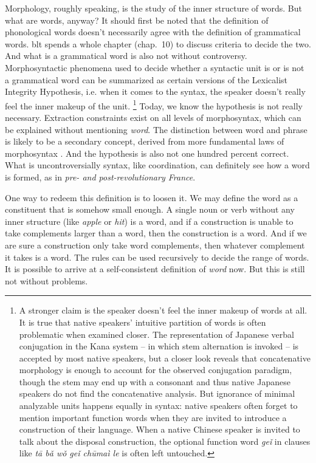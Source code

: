 \documentclass[UTF8, a4paper, oneside, scheme=plain]{ctexart}
\newcommand*{\citechap}[1]{chap.~{#1}}
\newcommand*{\term}[1]{\emph{#1}}
\newcommand*{\corpus}[1]{\emph{#1}}
\begin{document}
Morphology, roughly speaking, 
is the study of the inner structure of words.
But what are words, anyway?
It should first be noted that the definition of phonological words 
doesn't necessarily agree with the definition of grammatical words.
\ac{blt} spends a whole chapter (\citechap{10}) to discuss 
criteria to decide the two.
And what is a grammatical word is also not without controversy.
Morphosyntactic phenomena used to decide 
whether a syntactic unit is or is not a grammatical word 
can be summarized as certain versions of the Lexicalist Integrity Hypothesis,
i.e. when it comes to the syntax,
the speaker doesn't really feel the inner makeup of the unit.%
\footnote{
    A stronger claim is the speaker doesn't feel the inner makeup of words at all.
    It is true that native speakers' intuitive partition of words 
    is often problematic when examined closer.
    The representation of Japanese verbal conjugation in the Kana system
    -- in which stem alternation is invoked --
    is accepted by most native speakers,
    but a closer look reveals that concatenative morphology 
    is enough to account for the observed conjugation paradigm,
    though the stem may end up with a consonant and  
    thus native Japanese speakers do not find the concatenative analysis.
    But ignorance of minimal analyzable units happens equally in syntax: 
    native speakers often forget to mention important function words 
    when they are invited to introduce a construction of their language.
    When a native Chinese speaker is invited to talk about the disposal construction,
    the optional function word \corpus{geǐ} in clauses like 
    \corpus{t\={a} b\v{a} w\v{o} geǐ ch\={u}ma\`{i} le} %
    is often left untouched. %
}
Today, we know the hypothesis is not really necessary.
Extraction constraints exist on all levels of morphosyntax,
which can be explained without mentioning \term{word}.
The distinction between word and phrase is likely to be 
a secondary concept,
derived from more fundamental laws of morphosyntax
\citep{bruening2018lexicalist}.
And the hypothesis is also not one hundred percent correct.
What is uncontroversially syntax, like coordination, 
can definitely see how a word is formed,
as in \corpus{pre- and post-revolutionary France}.

One way to redeem this definition is to loosen it.
We may define the word as a constituent that is somehow small enough.
A single noun or verb without any inner structure (like \corpus{apple} or \corpus{hit}) is a word,
and if a construction is unable to take complements larger than a word,
then the construction is a word.
And if we are sure a construction only take word complements,
then whatever complement it takes is a word.
The rules can be used recursively to decide the range of words.
It is possible to arrive at a self-consistent definition of \term{word} now.
But this is still not without problems.
\end{document}

